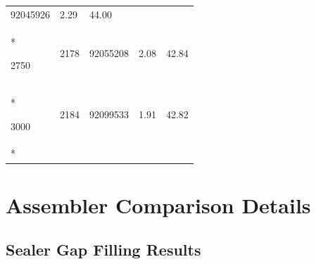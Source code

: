 \documentclass[
  12pt,
  oneside,
  openany]{book}
\begin{document}
\begin{appendices}
\begin{singlespace}
\begin{longtable}[]{@{}lllll@{}}
\begin{minipage}[t]{0.18\columnwidth}
92045926\strut
\end{minipage} & \begin{minipage}[t]{0.24\columnwidth}\raggedright
2.29\strut
\end{minipage} & \begin{minipage}[t]{0.18\columnwidth}\raggedright
44.00\strut
\end{minipage}\tabularnewline*
\begin{minipage}[t]{0.16\columnwidth}\raggedright
2750\strut
\end{minipage} & \begin{minipage}[t]{0.09\columnwidth}\raggedright
2178\strut
\end{minipage} & \begin{minipage}[t]{0.18\columnwidth}\raggedright
92055208\strut
\end{minipage} & \begin{minipage}[t]{0.24\columnwidth}\raggedright
2.08\strut
\end{minipage} & \begin{minipage}[t]{0.18\columnwidth}\raggedright
42.84\strut
\end{minipage}\tabularnewline*
\begin{minipage}[t]{0.16\columnwidth}\raggedright
3000\strut
\end{minipage} & \begin{minipage}[t]{0.09\columnwidth}\raggedright
2184\strut
\end{minipage} & \begin{minipage}[t]{0.18\columnwidth}\raggedright
92099533\strut
\end{minipage} & \begin{minipage}[t]{0.24\columnwidth}\raggedright
1.91\strut
\end{minipage} & \begin{minipage}[t]{0.18\columnwidth}\raggedright
42.82\strut
\end{minipage}\tabularnewline*
\bottomrule
\end{longtable}
\end{singlespace}

\hypertarget{assembler-comparison-details}{%
\section{Assembler Comparison Details}\label{assembler-comparison-details}}

\hypertarget{sealer-gap-filling-results}{%
\subsection{Sealer Gap Filling Results}\label{sealer-gap-filling-results}}


\end{appendices}
\end{document}
